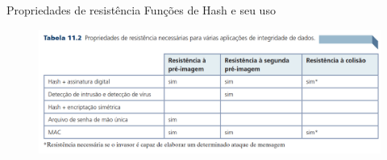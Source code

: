 \begin{frame}{Propriedades de resistência Funções de Hash e seu uso}
    
\begin{figure}
    \centering
    \includegraphics[width=\linewidth]{Figuras/propriedades-resistencia-hash.png}

\end{figure}
\end{frame}


